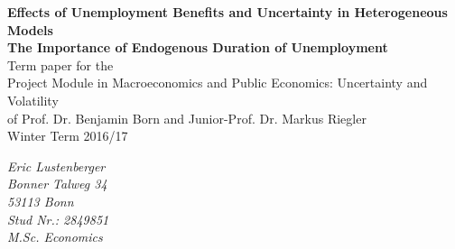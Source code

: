 \documentclass[a4paper,12pt]{article}
\begin{document}



\begin{titlepage}       %

\thispagestyle{empty}   %


\begin{center}
\vspace*{2.5cm}
{\bf  \Large Effects of Unemployment Benefits and Uncertainty in Heterogeneous Models\\The Importance of Endogenous Duration of Unemployment} \\
\vspace*{3cm} 
Term paper for the \\ Project Module in Macroeconomics and Public Economics: Uncertainty and Volatility \\
of Prof. Dr. Benjamin Born and Junior-Prof. Dr. Markus Riegler  \\
\vspace*{0.5cm} 
Winter Term 2016/17\\
\end{center}

\vfill
\begin{flushright}
   \emph{Eric Lustenberger} \\
    \emph{Bonner Talweg 34}\\
    \emph{53113 Bonn}\\
   \emph{Stud Nr.: 2849851}\\
 \emph{M.Sc. Economics}\\

\end{flushright}



% 
% 
% 

\end{titlepage}

\newpage                %



\end{document}
